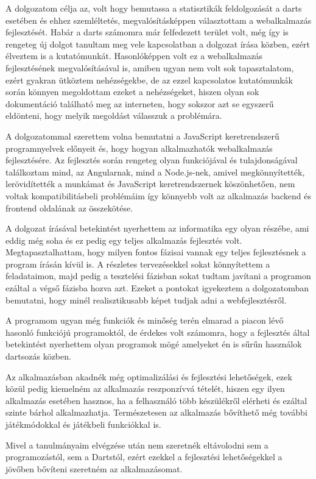 
A dolgozatom célja az, volt hogy bemutassa a statisztikák feldolgozását a darts esetében és ehhez szemléltetés, megvalósításképpen választottam a webalkalmazás fejlesztését. Habár a darts számomra már felfedezett terület volt, még így is rengeteg új dolgot tanultam meg vele kapcsolatban a dolgozat írása közben, ezért élveztem is a kutatómunkát. Hasonlóképpen volt ez a webalkalmazás fejlesztésének megvalósításával is, amiben ugyan nem volt sok tapasztalatom, ezért gyakran ütköztem nehézségekbe, de az ezzel kapcsolatos kutatómunkák során könnyen megoldottam ezeket a nehézségeket, hiszen olyan sok dokumentáció található meg az interneten, hogy sokszor azt se egyszerű eldönteni, hogy melyik megoldást válasszuk a problémára.

A dolgozatommal szerettem volna bemutatni a JavaScript keretrendszerű programnyelvek előnyeit és, hogy hogyan alkalmazhatók webalkalmazás fejlesztésére. Az fejlesztés során rengeteg olyan funkciójával és tulajdonságával találkoztam mind, az Angularnak, mind a Node.js-nek, amivel megkönnyítették, lerövidítették a munkámat és JavaScript keretrendszernek köszönhetően, nem voltak kompatibilitásbeli problémáim így könnyebb volt az alkalmazás backend és frontend oldalának az összekötése. 

A dolgozat írásával betekintést nyerhettem az informatika egy olyan részébe, ami eddig még soha és ez pedig egy teljes alkalmazás fejlesztés volt. Megtapasztalhattam, hogy milyen fontos fázisai vannak egy teljes fejlesztésnek a program írásán kívül is. A részletes tervezésekkel sokat könnyítettem a feladataimon, majd pedig a tesztelési fázisban sokat tudtam javítani a programon ezáltal a végső fázisba hozva azt. Ezeket a pontokat igyekeztem a dolgozatomban bemutatni, hogy minél realisztikusabb képet tudjak adni a webfejlesztésről.

A programom ugyan még funkciók és minőség terén elmarad a piacon lévő hasonló funkciójú programoktól, de érdekes volt számomra, hogy a fejlesztés által betekintést nyerhettem olyan programok mögé amelyeket én is sűrűn használok dartsozás közben.

Az alkalmazásban akadnék még optimalizálási és fejlesztési lehetőségek, ezek közül pedig kiemelném az alkalmazás reszponzívvá tételét, hiszen egy ilyen alkalmazás esetében hasznos, ha a felhasználó több készülékről elérheti és ezáltal szinte bárhol alkalmazhatja. Természetesen az alkalmazás bővíthető még további játékmódokkal és játékbeli funkciókkal is.

Mivel a tanulmányaim elvégzése után nem szeretnék eltávolodni sem a programozástól, sem a Dartstól, ezért ezekkel a fejlesztési lehetőségekkel a jövőben bővíteni szeretném az alkalmazásomat. 
